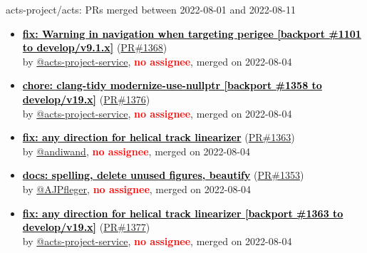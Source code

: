 \begin{frame}[allowframebreaks]{ acts-project/acts: PRs merged 
between 2022-08-01 and 2022-08-11
}
\begin{itemize}
    \item\prmerged
    \hspace*{0.1em}
    \textbf{\href{https://github.com/acts-project/acts/pull/1368}{\textcolor{black}{fix: Warning in navigation when targeting perigee [backport \#1101 to develop/v9.1.x]}}}
    (\href{https://github.com/acts-project/acts/pull/1368}{PR\#1368}) \\
    by \href{https://github.com/acts-project-service}{@acts-project-service}, {}\textbf{\textcolor{Red}{no assignee}}, merged on 2022-08-04

    \item\prmerged
    \hspace*{0.1em}
    \textbf{\href{https://github.com/acts-project/acts/pull/1376}{\textcolor{black}{chore: clang-tidy modernize-use-nullptr [backport \#1358 to develop/v19.x]}}}
    (\href{https://github.com/acts-project/acts/pull/1376}{PR\#1376}) \\
    by \href{https://github.com/acts-project-service}{@acts-project-service}, {}\textbf{\textcolor{Red}{no assignee}}, merged on 2022-08-04

    \item\prmerged
    \hspace*{0.1em}
    \textbf{\href{https://github.com/acts-project/acts/pull/1363}{\textcolor{black}{fix: any direction for helical track linearizer}}}
    (\href{https://github.com/acts-project/acts/pull/1363}{PR\#1363}) \\
    by \href{https://github.com/andiwand}{@andiwand}, {}\textbf{\textcolor{Red}{no assignee}}, merged on 2022-08-04

    \item\prmerged
    \hspace*{0.1em}
    \textbf{\href{https://github.com/acts-project/acts/pull/1353}{\textcolor{black}{docs: spelling, delete unused figures, beautify}}}
    (\href{https://github.com/acts-project/acts/pull/1353}{PR\#1353}) \\
    by \href{https://github.com/AJPfleger}{@AJPfleger}, {}\textbf{\textcolor{Red}{no assignee}}, merged on 2022-08-04

    \item\prmerged
    \hspace*{0.1em}
    \textbf{\href{https://github.com/acts-project/acts/pull/1377}{\textcolor{black}{fix: any direction for helical track linearizer [backport \#1363 to develop/v19.x]}}}
    (\href{https://github.com/acts-project/acts/pull/1377}{PR\#1377}) \\
    by \href{https://github.com/acts-project-service}{@acts-project-service}, {}\textbf{\textcolor{Red}{no assignee}}, merged on 2022-08-04


\end{itemize}
\end{frame}
